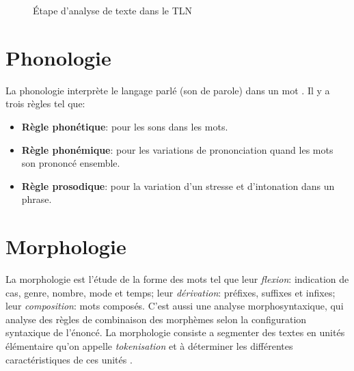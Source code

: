 \begin{figure}[htbp]
    \begin{center}
    \end{center}
    \caption{Étape d'analyse de texte dans le TLN \citep{handbook-nlp}}\label{fig:nlp-stage}
\end{figure}

\section{Phonologie}
La phonologie interprète le langage parlé (son de parole) dans un mot \citep{natural-language-processing}. Il y a trois règles tel que:
\begin{itemize}
    \item \textbf{Règle phonétique}: pour les sons dans les mots.
    \item \textbf{Règle phonémique}: pour les variations de prononciation quand les mots son prononcé ensemble.
    \item \textbf{Règle prosodique}: pour la variation d'un stresse et d'intonation dans un phrase.
\end{itemize}

\section{Morphologie}
La morphologie est l'étude de la forme des mots tel que leur \textit{flexion}: indication de cas, genre, nombre, mode et temps; leur \textit{dérivation}: préfixes, suffixes et infixes; leur \textit{composition}: mots composés. C'est aussi une analyse morphosyntaxique, qui analyse des règles de combinaison des morphèmes selon la configuration syntaxique de l’énoncé. La morphologie consiste a segmenter des textes en unités élémentaire qu'on appelle \textit{tokenisation} et à déterminer les différentes caractéristiques de ces unités \citep{automatic-nlp,natural-language-processing}.

